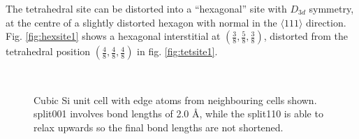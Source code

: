 \documentclass[11pt,bibliography=totoc,index=totoc]{scrbook}   %
\begin{document}
The tetrahedral site can be distorted into a ``hexagonal'' site with $D_{3d}$ symmetry, 
at the centre of a slightly distorted hexagon with normal in the $\langle 111 \rangle$ direction. 
Fig. \ref{fig:hexsite1} shows a hexagonal interstitial at $(\frac{3}{8},\frac{5}{8},\frac{3}{8})$, 
distorted from the tetrahedral position $(\frac{4}{8},\frac{4}{8},\frac{4}{8})$ in fig. \ref{fig:tetsite1}.


\begin{figure}[htbp]
  \centering
  \\
  \caption{Cubic Si unit cell with edge atoms from neighbouring cells shown.
  split001 involves bond lengths of 2.0 Å,
  while the split110 is able to relax upwards so the final bond lengths are not shortened.
  }
  \label{fig:interstitials}
\end{figure}
\end{document}
